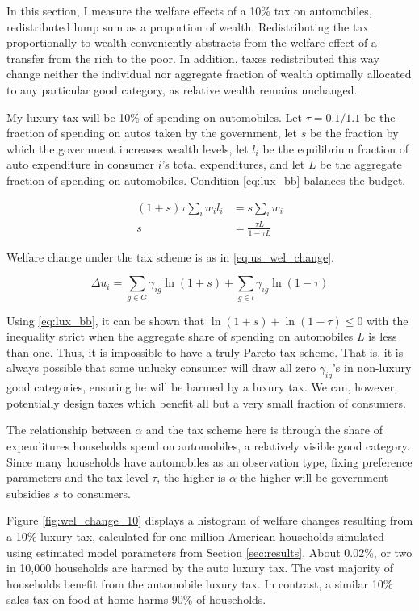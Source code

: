 \documentclass[12pt]{article}
\begin{document}
In this section, I measure the welfare effects of a 10\% tax on automobiles, redistributed lump sum as a proportion of wealth.  Redistributing the tax proportionally to wealth conveniently abstracts from the welfare effect of a transfer from the rich to the poor.  In addition, taxes redistributed this way change neither the individual nor aggregate fraction of wealth optimally allocated to any particular good category, as relative wealth remains unchanged.

My luxury tax will be 10\% of spending on automobiles.  Let $\tau = 0.1 / 1.1$ be the fraction of spending on autos taken by the government, let $s$ be the fraction by which the government increases wealth levels, let $l_i$ be the equilibrium fraction of auto expenditure in consumer $i$'s total expenditures, and let $L$ be the aggregate fraction of spending on automobiles.  Condition \eqref{eq:lux_bb} balances the budget.

\begin{align}
    (1 + s) \tau \sum_i w_i l_i &= s \sum_i w_i \nonumber \\
    s &= \frac{\tau L}{1 - \tau L}
\end{align}

Welfare change under the tax scheme is as in \eqref{eq:us_wel_change}.

\begin{equation}
    \label{eq:us_wel_change}
    \Delta u_i = \sum_{g\in G} \gamma_{ig} \ln(1 + s) + \sum_{g\in l} \gamma_{ig} \ln (1 - \tau)
\end{equation}

Using \eqref{eq:lux_bb}, it can be shown that $\ln(1+s) + \ln(1 - \tau) \leq 0$ with the inequality strict when the aggregate share of spending on automobiles $L$ is less than one.  Thus, it is impossible to have a truly Pareto tax scheme.  That is, it is always possible that some unlucky consumer will draw all zero $\gamma_{ig}$'s in non-luxury good categories, ensuring he will be harmed by a luxury tax.  We can, however, potentially design taxes which benefit all but a very small fraction of consumers.

The relationship between $\alpha$ and the tax scheme here is through the share of expenditures households spend on automobiles, a relatively visible good category.  Since many households have automobiles as an observation type, fixing preference parameters and the tax level $\tau$, the higher is $\alpha$ the higher will be government subsidies $s$ to consumers.

Figure \ref{fig:wel_change_10} displays a histogram of welfare changes resulting from a 10\% luxury tax, calculated for one million American households simulated using estimated model parameters from Section \ref{sec:results}.  About 0.02\%, or two in 10,000 households are harmed by the auto luxury tax.  The vast majority of households benefit from the automobile luxury tax.  In contrast, a similar 10\% sales tax on food at home harms 90\% of households.
\end{document}
